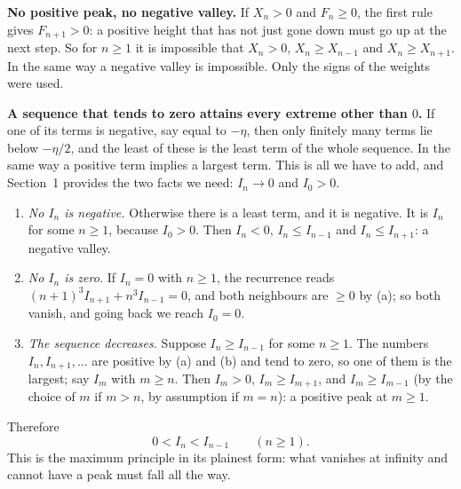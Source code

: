 \documentclass[11pt]{article}
\newcommand{\q}[1]{\medskip\noindent\textbf{#1}}
\begin{document}
\q{No positive peak, no negative valley.} If $X_n>0$ and $F_n\ge0$, the first rule gives
$F_{n+1}>0$: a positive height that has not just gone down must go up at the next step. So for
$n\ge1$ it is impossible that $X_n>0$, $X_n\ge X_{n-1}$ and $X_n\ge X_{n+1}$. In the same way a
negative valley is impossible. Only the signs of the weights were used.
\begin{center}
\end{center}

\q{A sequence that tends to zero attains every extreme other than $0$.} If one of its terms is
negative, say equal to $-\eta$, then only finitely many terms lie below $-\eta/2$, and the least of
these is the least term of the whole sequence. In the same way a positive term implies a largest
term. This is all we have to add, and Section~1 provides the two facts we need: $I_n\to0$ and
$I_0>0$.
\begin{enumerate}[label=(\alph*)]
\item \emph{No $I_n$ is negative.} Otherwise there is a least term, and it is negative. It is
$I_n$ for some $n\ge1$, because $I_0>0$. Then $I_n<0$, $I_n\le I_{n-1}$ and $I_n\le I_{n+1}$: a
negative valley.
\item \emph{No $I_n$ is zero.} If $I_n=0$ with $n\ge1$, the recurrence reads
$(n+1)^3I_{n+1}+n^3I_{n-1}=0$, and both neighbours are $\ge0$ by (a); so both vanish, and going back
we reach $I_0=0$.
\item \emph{The sequence decreases.} Suppose $I_n\ge I_{n-1}$ for some $n\ge1$. The numbers
$I_n,I_{n+1},\dots$ are positive by (a) and (b) and tend to zero, so one of them is the largest; say
$I_m$ with $m\ge n$. Then $I_m>0$, $I_m\ge I_{m+1}$, and $I_m\ge I_{m-1}$ (by the choice of $m$ if
$m>n$, by assumption if $m=n$): a positive peak at $m\ge1$.
\end{enumerate}
Therefore
\[
0<I_n<I_{n-1}\qquad(n\ge1).
\]
This is the maximum principle in its plainest form: what vanishes at infinity and cannot have a
peak must fall all the way.
\end{document}
